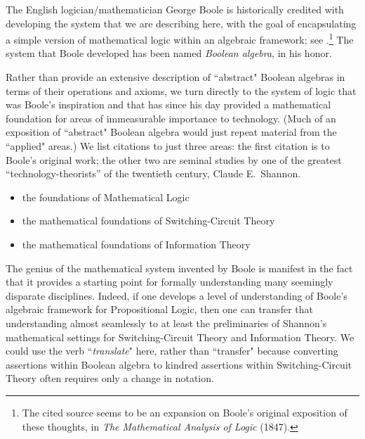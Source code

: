 The English logician/mathematician George Boole is historically credited with developing the system that we are describing here, with the goal of encapsulating a simple version of
mathematical logic within an algebraic framework; see
\cite{Boole54}.\footnote{The cited source seems to be an expansion on Boole's original exposition of these thoughts, in {\it The Mathematical Analysis of Logic} (1847).}  The system that Boole developed has been named {\it Boolean algebra}, in his honor.

\smallskip

Rather than provide an extensive description of ``abstract" Boolean algebras in terms of their operations and axioms, we turn directly to the system of logic that was Boole's inspiration and that has since his day provided a mathematical foundation for areas of immeasurable importance to technology.  (Much of an exposition of ``abstract" Boolean algebra would just repeat material from the ``applied" areas.)  We list citations to just three areas: the first citation is to Boole's original work; the other two are seminal studies by one of the greatest ``technology-theorists'' of the twentieth century, Claude E.~Shannon. 
\begin{itemize}
\item
the foundations of Mathematical Logic \cite{Boole54}
\medskip\item
the mathematical foundations of Switching-Circuit Theory \cite{Shannon38}
\medskip\item
the mathematical foundations of Information Theory \cite{Shannon48}
\end{itemize}
The genius of the mathematical system invented by Boole is manifest in the fact that it provides a starting point for formally understanding many seemingly disparate disciplines.  Indeed, if one develops a level of understanding of Boole's algebraic framework for Propositional Logic, then one can transfer that understanding almost seamlessly to at least the preliminaries of Shannon's mathematical settings for Switching-Circuit Theory and Information Theory.  We could use the verb ``{\em translate}" here, rather than ``transfer" because converting assertions within Boolean algebra to kindred assertions within Switching-Circuit Theory often requires only a change in notation.



 

